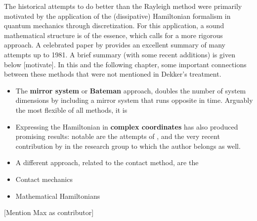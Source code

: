 The historical attempts to do better than the Rayleigh method were primarily motivated by the application of the (dissipative) Hamiltonian formalism in quantum mechanics through discretization. For this application, a sound mathematical structure is of the essence, which calls for a more rigorous approach. A celebrated paper by \citet{Dekker1981} provides an excellent summary of many attempts up to 1981. A brief summary (with some recent additions) is given below [motivate]. In this and the following chapter, some important connections between these methods that were not mentioned in Dekker's treatment.
\begin{itemize}
    \item The \textbf{mirror system} or \textbf{Bateman} approach, doubles the number of system dimensions by including a mirror system that runs opposite in time. Arguably the most flexible of all methods, it is 
    \item Expressing the Hamiltonian in \textbf{complex coordinates} has also produced promising results: notable are the attempts of \citet{Bopp1974}, \citet{Dedene1980} and the very recent contribution by \citet{Hutters2020b} in the research group to which the author belongs as well.
    \item A different approach, related to the contact method, are the 
    \item Contact mechanics
    \item Mathematical Hamiltonians
\end{itemize}

[Mention Max as contributor]

